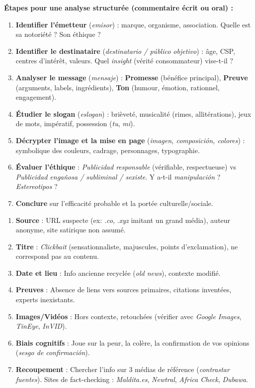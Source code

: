 \documentclass[11pt]{article}
\begin{document}
\begin{methode}
\textbf{Étapes pour une analyse structurée (commentaire écrit ou oral) :}
\begin{enumerate}
    \item \textbf{Identifier l'émetteur} (\emph{emisor}) : marque, organisme, association. Quelle est sa notoriété ? Son éthique ?
    \item \textbf{Identifier le destinataire} (\emph{destinatario / público objetivo}) : âge, CSP, centres d'intérêt, valeurs. Quel \emph{insight} (vérité consommateur) vise-t-il ?
    \item \textbf{Analyser le message} (\emph{mensaje}) : \textbf{Promesse} (bénéfice principal), \textbf{Preuve} (arguments, labels, ingrédients), \textbf{Ton} (humour, émotion, rationnel, engagement).
    \item \textbf{Étudier le slogan} (\emph{eslogan}) : brièveté, musicalité (rimes, allitérations), jeux de mots, impératif, possession (\emph{tu}, \emph{mi}).
    \item \textbf{Décrypter l'image et la mise en page} (\emph{imagen, composición, colores}) : symbolique des couleurs, cadrage, personnages, typographie.
    \item \textbf{Évaluer l'éthique} : \emph{Publicidad responsable} (vérifiable, respectueuse) vs \emph{Publicidad engañosa / subliminal / sexiste}. Y a-t-il \emph{manipulación} ? \emph{Estereotipos} ?
    \item \textbf{Conclure} sur l'efficacité probable et la portée culturelle/sociale.
\end{enumerate}
\end{methode}

\begin{methode}
\begin{enumerate}
    \item \textbf{Source} : URL suspecte (ex: \emph{.co}, \emph{.xyz} imitant un grand média), auteur anonyme, site satirique non assumé.
    \item \textbf{Titre} : \emph{Clickbait} (sensationnaliste, majuscules, points d'exclamation), ne correspond pas au contenu.
    \item \textbf{Date et lieu} : Info ancienne recyclée (\emph{old news}), contexte modifié.
    \item \textbf{Preuves} : Absence de liens vers sources primaires, citations inventées, experts inexistants.
    \item \textbf{Images/Vidéos} : Hors contexte, retouchées (vérifier avec \emph{Google Images}, \emph{TinEye}, \emph{InVID}).
    \item \textbf{Biais cognitifs} : Joue sur la peur, la colère, la confirmation de vos opinions (\emph{sesgo de confirmación}).
    \item \textbf{Recoupement} : Chercher l'info sur 3 médias de référence (\emph{contrastar fuentes}). Sites de fact-checking : \emph{Maldita.es}, \emph{Newtral}, \emph{Africa Check}, \emph{Dubawa}.
\end{enumerate}
\end{methode}
\end{document}
